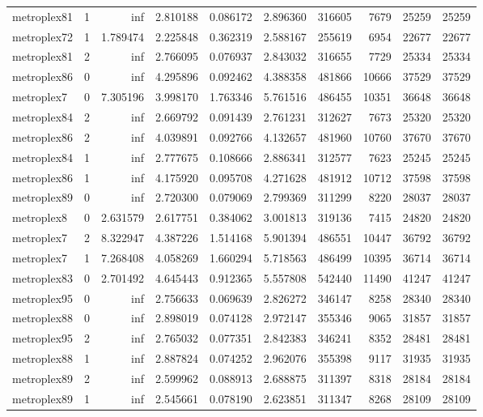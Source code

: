 \begin{longtable}{|l|r|r|r|r|r|r|r|r|r|}
metroplex81 & 1 & inf & 2.810188 & 0.086172 & 2.896360 & 316605 & 7679 & 25259 & 25259 \\
metroplex72 & 1 & 1.789474 & 2.225848 & 0.362319 & 2.588167 & 255619 & 6954 & 22677 & 22677 \\
metroplex81 & 2 & inf & 2.766095 & 0.076937 & 2.843032 & 316655 & 7729 & 25334 & 25334 \\
metroplex86 & 0 & inf & 4.295896 & 0.092462 & 4.388358 & 481866 & 10666 & 37529 & 37529 \\
metroplex7 & 0 & 7.305196 & 3.998170 & 1.763346 & 5.761516 & 486455 & 10351 & 36648 & 36648 \\
metroplex84 & 2 & inf & 2.669792 & 0.091439 & 2.761231 & 312627 & 7673 & 25320 & 25320 \\
metroplex86 & 2 & inf & 4.039891 & 0.092766 & 4.132657 & 481960 & 10760 & 37670 & 37670 \\
metroplex84 & 1 & inf & 2.777675 & 0.108666 & 2.886341 & 312577 & 7623 & 25245 & 25245 \\
metroplex86 & 1 & inf & 4.175920 & 0.095708 & 4.271628 & 481912 & 10712 & 37598 & 37598 \\
metroplex89 & 0 & inf & 2.720300 & 0.079069 & 2.799369 & 311299 & 8220 & 28037 & 28037 \\
metroplex8 & 0 & 2.631579 & 2.617751 & 0.384062 & 3.001813 & 319136 & 7415 & 24820 & 24820 \\
metroplex7 & 2 & 8.322947 & 4.387226 & 1.514168 & 5.901394 & 486551 & 10447 & 36792 & 36792 \\
metroplex7 & 1 & 7.268408 & 4.058269 & 1.660294 & 5.718563 & 486499 & 10395 & 36714 & 36714 \\
metroplex83 & 0 & 2.701492 & 4.645443 & 0.912365 & 5.557808 & 542440 & 11490 & 41247 & 41247 \\
metroplex95 & 0 & inf & 2.756633 & 0.069639 & 2.826272 & 346147 & 8258 & 28340 & 28340 \\
metroplex88 & 0 & inf & 2.898019 & 0.074128 & 2.972147 & 355346 & 9065 & 31857 & 31857 \\
metroplex95 & 2 & inf & 2.765032 & 0.077351 & 2.842383 & 346241 & 8352 & 28481 & 28481 \\
metroplex88 & 1 & inf & 2.887824 & 0.074252 & 2.962076 & 355398 & 9117 & 31935 & 31935 \\
metroplex89 & 2 & inf & 2.599962 & 0.088913 & 2.688875 & 311397 & 8318 & 28184 & 28184 \\
metroplex89 & 1 & inf & 2.545661 & 0.078190 & 2.623851 & 311347 & 8268 & 28109 & 28109 \\

\end{longtable}
